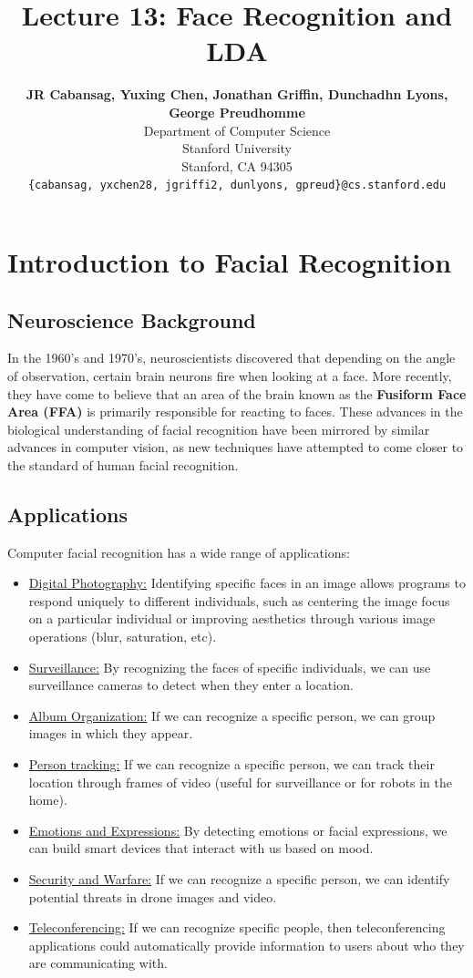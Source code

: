 \documentclass{article}
\title{Lecture 13: Face Recognition and LDA}
\author{
  \textbf{JR Cabansag, Yuxing Chen, Jonathan Griffin, Dunchadhn Lyons, George Preudhomme} \\
  Department of Computer Science\\
  Stanford University\\
  Stanford, CA 94305 \\
  \texttt{\{cabansag, yxchen28, jgriffi2, dunlyons, gpreud\}@cs.stanford.edu} \\
}
\begin{document}
\maketitle

\section{Introduction to Facial Recognition}
\subsection{Neuroscience Background}
In the 1960's and 1970's, neuroscientists discovered that depending on the angle of observation, certain brain neurons fire when looking at a face. More recently, they have come to believe that an area of the brain known as the \textbf{Fusiform Face Area (FFA)} is primarily responsible for reacting to faces. These advances in the biological understanding of facial recognition have been mirrored by similar advances in computer vision, as new techniques have attempted to come closer to the standard of human facial recognition. 

\subsection{Applications}
Computer facial recognition has a wide range of applications:
\begin{itemize}
  \item \underline{Digital Photography:} Identifying specific faces in an image allows programs to respond uniquely to different individuals, such as centering the image focus on a particular individual or improving aesthetics through various image operations (blur, saturation, etc).
  \item \underline{Surveillance:} By recognizing the faces of specific individuals, we can use surveillance cameras to detect when they enter a location.
  \item \underline{Album Organization:} If we can recognize a specific person, we can group images in which they appear.
  \item \underline{Person tracking:} If we can recognize a specific person, we can track their location through frames of video (useful for surveillance or for robots in the home).
  \item \underline{Emotions and Expressions:} By detecting emotions or facial expressions, we can build smart devices that interact with us based on mood.
  \item \underline{Security and Warfare:} If we can recognize a specific person, we can identify potential threats in drone images and video.
  \item \underline{Teleconferencing:} If we can recognize specific people, then teleconferencing applications could automatically provide information to users about who they are communicating with.
\end{itemize}
\end{document}
